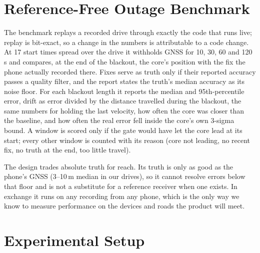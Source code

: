 \documentclass[conference]{IEEEtran}
\begin{document}
\section{Reference-Free Outage Benchmark}
\label{sec:bench}
The benchmark replays a recorded drive through exactly the code that runs
live; replay is bit-exact, so a change in the numbers is attributable to a code
change. At 17 start times spread over the drive it withholds GNSS for 10, 30,
60 and 120\,s and compares, at the end of the blackout, the core's position
with the fix the phone actually recorded there. Fixes serve as truth only
if their reported accuracy passes a quality filter, and the report states the
truth's median accuracy as its noise floor. For each blackout length it
reports the median and 95th-percentile error, drift as error divided by the
distance travelled during the blackout, the same numbers for holding the last
velocity, how often the core was closer than the baseline, and how often the
real error fell inside the core's own 3-sigma bound. A window is scored only if
the gate would have let the core lead at its start; every other window is
counted with its reason (core not leading, no recent fix, no truth at the end,
too little travel).

The design trades absolute truth for reach. Its truth is only as good as the
phone's GNSS (3--10\,m median in our drives), so it cannot resolve errors below
that floor and is not a substitute for a reference receiver when one exists.
In exchange it runs on any recording from any phone, which is the only way we
know to measure performance on the devices and roads the product will meet.

\section{Experimental Setup}
\label{sec:setup}
\end{document}
